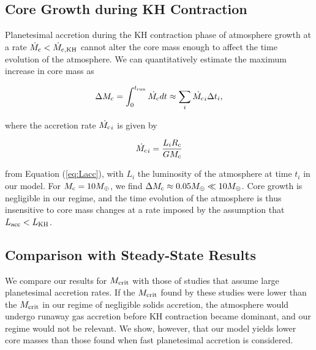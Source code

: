 \documentclass[apj]{emulateapj}
\newcommand{\co}{_{\rm c}}
\begin{document}
\subsection{Core Growth during KH Contraction}
\label{raf3}

Planetesimal accretion during the KH contraction phase of atmosphere growth at a rate $\dot{M}_{\rm c}<\dot{M}_{\rm{c,KH}}$  cannot alter the core mass enough to affect the time evolution of the atmosphere. We can quantitatively estimate the maximum increase in core mass as 

\begin{equation}
\label{eq:cminc}
\Delta M_{\rm{c}} = \int_0^{t_{\rm{run}}} \dot{M_{\rm{c}}} dt \approx \sum_i \dot{M_{\rm{c}}}_i \Delta t_i,
\end{equation}
 
 \noindent where the accretion rate $ \dot{M_{\rm{c}}}_i $ is given by 
 
 \begin{equation}
 \label{eq:Mdotexp}
 \dot{M_{\rm{c}}}_i =\frac{L_i R\co}{G M_{\rm{c}}} 
 \end{equation}
 
 \noindent from Equation (\ref{eq:Lacc}), with $L_i$ the luminosity of the atmosphere at time $t_i$ in our model. For $M_{\rm{c}}=10 M_{\oplus}$, we find $\Delta M_{\rm{c}} \approx 0.05 M_{\oplus} \ll 10 M_{\oplus}$. Core growth is negligible in our regime, and the time evolution of the atmosphere is thus insensitive to core mass changes at a rate imposed by the assumption that $L_{\rm{acc}}<L_{\rm{KH}}$.



\subsection{Comparison with Steady-State Results}
\label{raf2}

We compare our results for $M_{\rm crit}$ with those of studies that assume large planetesimal accretion rates. If the $M_{\rm crit}$ found by these studies were lower than the $M_{\rm crit}$ in our regime of negligible solids accretion, the atmosphere would undergo runaway gas accretion before KH contraction became dominant, and our regime would not be relevant. We show, however, that our model yields lower core masses than those found when fast planetesimal accretion is considered. 
\end{document}
